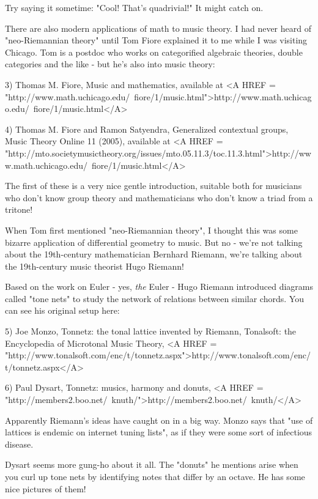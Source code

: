 Try saying it sometime: "Cool!  That's quadrivial!"
It might catch on.

There are also modern applications of math to music theory.  I had 
never heard of "neo-Riemannian theory" until Tom Fiore explained it 
to me while I was visiting Chicago.  Tom is a postdoc who works on 
categorified algebraic theories, double categories and the like -
but he's also into music theory:

3) Thomas M. Fiore, Music and mathematics, available at
<A HREF = "http://www.math.uchicago.edu/~fiore/1/music.html">http://www.math.uchicago.edu/~fiore/1/music.html</A>

4) Thomas M. Fiore and Ramon Satyendra, Generalized contextual
groups, Music Theory Online 11 (2005), available at
<A HREF = "http://mto.societymusictheory.org/issues/mto.05.11.3/toc.11.3.html">http://www.math.uchicago.edu/~fiore/1/music.html</A>

The first of these is a very nice gentle introduction, suitable
both for musicians who don't know group theory and mathematicians
who don't know a triad from a tritone!

When Tom first mentioned "neo-Riemannian theory", I thought this
was some bizarre application of differential geometry to music.  
But no - we're not talking about the 19th-century mathematician 
Bernhard Riemann, we're talking about the 19th-century music 
theorist Hugo Riemann!  

Based on the work on Euler - yes, \emph{the} Euler - Hugo Riemann 
introduced diagrams called "tone nets" to study the network of 
relations between similar chords.  You can see his original 
setup here:

5) Joe Monzo, Tonnetz: the tonal lattice invented by Riemann, 
Tonalsoft: the Encyclopedia of Microtonal Music Theory,
<A HREF = "http://www.tonalsoft.com/enc/t/tonnetz.aspx">http://www.tonalsoft.com/enc/t/tonnetz.aspx</A>

6) Paul Dysart, Tonnetz: musics, harmony and donuts,
<A HREF = "http://members2.boo.net/~knuth/">http://members2.boo.net/~knuth/</A>

Apparently Riemann's ideas have caught on in a big way.  Monzo 
says that "use of lattices is endemic on internet tuning lists", 
as if they were some sort of infectious disease.  

Dysart seems more gung-ho about it all.  The "donuts" he mentions 
arise when you curl up tone nets by identifying notes that differ  
by an octave.  He has some nice pictures of them!


